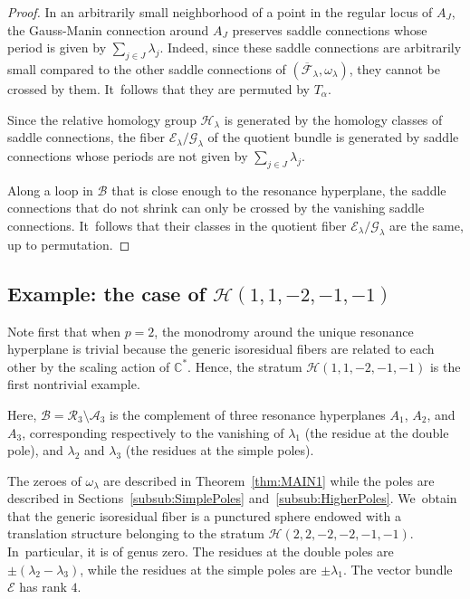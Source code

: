 \documentclass[11pt]{article}
\newcommand\calH{{\mathcal H}}
\theoremstyle{definition}
\begin{document}
\begin{proof}
In an arbitrarily small neighborhood of a point in the regular locus of $A_{J}$, the Gauss-Manin connection around $A_{J}$ preserves saddle connections whose period is given by $\sum_{j \in J} \lambda_{j}$. Indeed, since these saddle connections are arbitrarily small compared to the other saddle connections of $(\overline{\mathcal{F}}_{\lambda},\omega_{\lambda})$, they cannot be crossed by them. It~follows that they are permuted by $T_{\alpha}$.

Since the relative homology group $\calH_{\lambda}$ is generated by the homology classes of saddle connections, the fiber $\mathcal{E}_{\lambda}/\mathcal{G}_{\lambda}$ of the quotient bundle is generated by saddle connections whose periods are not given by $\sum_{j \in J} \lambda_{j}$.

Along a loop in $\mathcal{B}$ that is close enough to the resonance hyperplane, the saddle connections that do not shrink can only be crossed by the vanishing saddle connections. It~follows that their classes in the quotient fiber $\mathcal{E}_{\lambda}/\mathcal{G}_{\lambda}$ are the same, up to permutation.
\end{proof}

\subsection{Example: the case of $\mathcal{H}(1,1,-2,-1,-1)$}\label{sub:monoExample}

Note first that when $p=2$, the monodromy around the unique resonance hyperplane is trivial because the generic isoresidual fibers are related to each other by the scaling action of $\mathbb{C}^{\ast}$. Hence, the stratum $\mathcal{H}(1,1,-2,-1,-1)$ is the first nontrivial example.

Here, $\mathcal{B} = \mathcal{R}_{3} \setminus \mathcal{A}_{3}$ is the complement of three resonance hyperplanes $A_{1}$, $A_{2}$, and~$A_{3}$, corresponding respectively to the vanishing of $\lambda_{1}$ (the residue at the double pole), and $\lambda_{2}$ and $\lambda_{3}$ (the residues at the simple poles).

The zeroes of $\omega_{\lambda}$ are described in Theorem~\ref{thm:MAIN1} while the poles are described in Sections~\ref{subsub:SimplePoles} and~\ref{subsub:HigherPoles}. We~obtain that the generic isoresidual fiber is a punctured sphere endowed with a translation structure belonging to the stratum $\mathcal{H}(2,2,-2,-2,-1,-1)$. In~particular, it is of genus zero. The residues at the double poles are $\pm (\lambda_{2}-\lambda_{3})$, while the residues at the simple poles are $\pm\lambda_{1}$. The vector bundle $\mathcal{E}$ has rank $4$.
\end{document}

